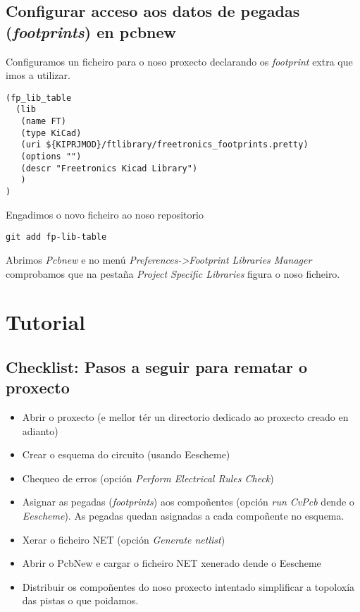 \documentclass[12pt,galician,]{article}
\providecommand{\tightlist}{%
  \setlength{\itemsep}{0pt}\setlength{\parskip}{0pt}}
\begin{document}
\subsection{\texorpdfstring{Configurar acceso aos datos de pegadas
(\emph{footprints}) en
pcbnew}{Configurar acceso aos datos de pegadas (footprints) en pcbnew}}\label{configurar-acceso-aos-datos-de-pegadas-footprints-en-pcbnew}

Configuramos un ficheiro para o noso proxecto declarando os
\emph{footprint} extra que imos a utilizar.

\begin{verbatim}
(fp_lib_table
  (lib
   (name FT)
   (type KiCad)
   (uri ${KIPRJMOD}/ftlibrary/freetronics_footprints.pretty)
   (options "")
   (descr "Freetronics Kicad Library")
   )
)
\end{verbatim}

Engadimos o novo ficheiro ao noso repositorio

\begin{verbatim}
git add fp-lib-table
\end{verbatim}

Abrimos \emph{Pcbnew} e no menú
\emph{Preferences-\textgreater{}Footprint Libraries Manager} comprobamos
que na pestaña \emph{Project Specific Libraries} figura o noso ficheiro.

\section{Tutorial}\label{tutorial}

\subsection{Checklist: Pasos a seguir para rematar o
proxecto}\label{checklist-pasos-a-seguir-para-rematar-o-proxecto}

\begin{itemize}
\tightlist
\item
  Abrir o proxecto (e mellor tér un directorio dedicado ao proxecto
  creado en adianto)
\item
  Crear o esquema do circuito (usando Eescheme)
\item
  Chequeo de erros (opción \emph{Perform Electrical Rules Check})
\item
  Asignar as pegadas (\emph{footprints}) aos compoñentes (opción
  \emph{run CvPcb} dende o \emph{Eescheme}). As pegadas quedan asignadas
  a cada compoñente no esquema.
\item
  Xerar o ficheiro NET (opción \emph{Generate netlist})
\item
  Abrir o PcbNew e cargar o ficheiro NET xenerado dende o Eescheme
\item
  Distribuir os compoñentes do noso proxecto intentado simplificar a
  topoloxía das pistas o que poidamos.
\end{itemize}
\end{document}
